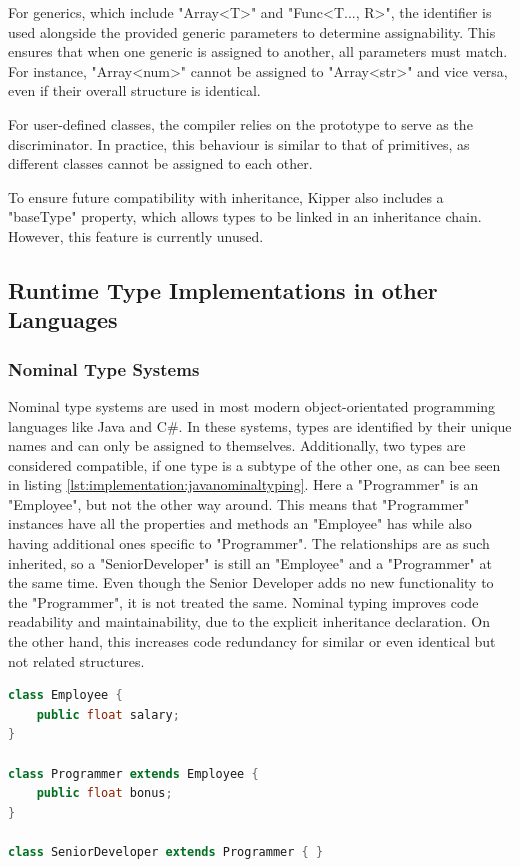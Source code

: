 For generics, which include "Array<T>" and "Func<T..., R>", the identifier is used alongside the provided generic parameters to determine assignability. This ensures that when one generic is assigned to another, all parameters must match. For instance, "Array<num>" cannot be assigned to "Array<str>" and vice versa, even if their overall structure is identical.

For user-defined classes, the compiler relies on the prototype to serve as the discriminator. In practice, this behaviour is similar to that of primitives, as different classes cannot be assigned to each other.

To ensure future compatibility with inheritance, Kipper also includes a "baseType" property, which allows types to be linked in an inheritance chain. However, this feature is currently unused.

\subsection{Runtime Type Implementations in other Languages}
\label{chap:runtime-other-languages}

\subsubsection{Nominal Type Systems}

Nominal type systems are used in most modern object-orientated programming languages like Java and C\#. In these systems, types are identified by their unique names and can only be assigned to themselves. Additionally, two types are considered compatible, if one type is a subtype of the other one, as can bee seen in listing \ref{lst:implementation:javanominaltyping}. Here a "Programmer" is an "Employee", but not the other way around. This means that "Programmer" instances have all the properties and methods an "Employee" has while also having additional ones specific to "Programmer". The relationships are as such inherited, so a "SeniorDeveloper" is still an "Employee" and a "Programmer" at the same time. Even though the Senior Developer adds no new functionality to the "Programmer", it is not treated the same. Nominal typing improves code readability and maintainability, due to the explicit inheritance declaration. On the other hand, this increases code redundancy for similar or even identical but not related structures.

\begin{lstlisting}[language=Java,caption=Example of nominal typing in Java,label=lst:implementation:javanominaltyping]
class Employee {
	public float salary;
}

class Programmer extends Employee {
	public float bonus;
}

class SeniorDeveloper extends Programmer { }
\end{lstlisting}


